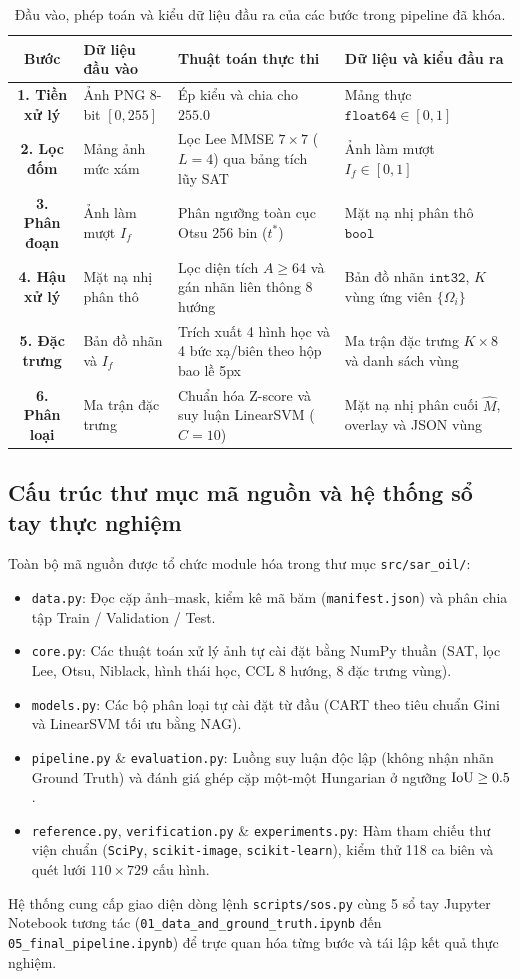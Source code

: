 \begin{table}[!htbp]
\centering
\small
\caption{Đầu vào, phép toán và kiểu dữ liệu đầu ra của các bước trong pipeline đã khóa.}
\label{tab:luong_du_lieu_pipeline}
\begin{tabular}{|c|p{2.8cm}|p{4.6cm}|p{4.0cm}|}
\hline
\textbf{Bước} & \textbf{Dữ liệu đầu vào} & \textbf{Thuật toán thực thi} & \textbf{Dữ liệu và kiểu đầu ra} \\ \hline
\textbf{1. Tiền xử lý} & Ảnh PNG 8-bit $[0, 255]$ & Ép kiểu và chia cho $255.0$ & Mảng thực $\texttt{float64} \in [0, 1]$ \\ \hline
\textbf{2. Lọc đốm} & Mảng ảnh mức xám & Lọc Lee MMSE $7 \times 7$ ($L=4$) qua bảng tích lũy SAT & Ảnh làm mượt $I_f \in [0, 1]$ \\ \hline
\textbf{3. Phân đoạn} & Ảnh làm mượt $I_f$ & Phân ngưỡng toàn cục Otsu 256 bin ($t^*$) & Mặt nạ nhị phân thô $\texttt{bool}$ \\ \hline
\textbf{4. Hậu xử lý} & Mặt nạ nhị phân thô & Lọc diện tích $A \ge 64$ và gán nhãn liên thông 8 hướng & Bản đồ nhãn $\texttt{int32}$, $K$ vùng ứng viên $\{\Omega_i\}$ \\ \hline
\textbf{5. Đặc trưng} & Bản đồ nhãn và $I_f$ & Trích xuất 4 hình học và 4 bức xạ/biên theo hộp bao lề 5px & Ma trận đặc trưng $K \times 8$ và danh sách vùng \\ \hline
\textbf{6. Phân loại} & Ma trận đặc trưng & Chuẩn hóa Z-score và suy luận LinearSVM ($C=10$) & Mặt nạ nhị phân cuối $\hat{M}$, overlay và JSON vùng \\ \hline
\end{tabular}
\end{table}

\subsection{Cấu trúc thư mục mã nguồn và hệ thống sổ tay thực nghiệm}

Toàn bộ mã nguồn được tổ chức module hóa trong thư mục \texttt{src/sar\_oil/}:
\begin{itemize}
    \item \texttt{data.py}: Đọc cặp ảnh--mask, kiểm kê mã băm (\texttt{manifest.json}) và phân chia tập Train / Validation / Test.
    \item \texttt{core.py}: Các thuật toán xử lý ảnh tự cài đặt bằng NumPy thuần (SAT, lọc Lee, Otsu, Niblack, hình thái học, CCL 8 hướng, 8 đặc trưng vùng).
    \item \texttt{models.py}: Các bộ phân loại tự cài đặt từ đầu (CART theo tiêu chuẩn Gini và LinearSVM tối ưu bằng NAG).
    \item \texttt{pipeline.py} \& \texttt{evaluation.py}: Luồng suy luận độc lập (không nhận nhãn Ground Truth) và đánh giá ghép cặp một-một Hungarian ở ngưỡng $\mathrm{IoU} \ge 0.5$.
    \item \texttt{reference.py}, \texttt{verification.py} \& \texttt{experiments.py}: Hàm tham chiếu thư viện chuẩn (\texttt{SciPy}, \texttt{scikit-image}, \texttt{scikit-learn}), kiểm thử 118 ca biên và quét lưới $110 \times 729$ cấu hình.
\end{itemize}

Hệ thống cung cấp giao diện dòng lệnh \texttt{scripts/sos.py} cùng 5 sổ tay Jupyter Notebook tương tác (\texttt{01\_data\_and\_ground\_truth.ipynb} đến \texttt{05\_final\_pipeline.ipynb}) để trực quan hóa từng bước và tái lập kết quả thực nghiệm.
